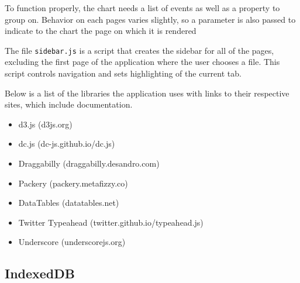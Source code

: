 \documentclass{hmcclinic}
\begin{document}
  To function properly, the chart needs a list of events
  as well as a property to group on. Behavior on each pages varies
  slightly, so a parameter is also passed to indicate to the chart the page on
  which it is rendered

  The file \texttt{sidebar.js} is a script that creates the sidebar for all of the
  pages, excluding the first page of the application where the user chooses a file.
  This script controls navigation and sets highlighting of the current tab.

  Below is a list of the libraries the application uses with links to
  their respective sites, which include documentation.
\begin{itemize}
\item d3.js (d3js.org)
\item dc.js (dc-js.github.io/dc.js)
\item Draggabilly (draggabilly.desandro.com)
\item Packery (packery.metafizzy.co)
\item DataTables (datatables.net)
\item Twitter Typeahead (twitter.github.io/typeahead.js)
\item Underscore (underscorejs.org)
\end{itemize}

  \subsection{IndexedDB}
\end{document}
